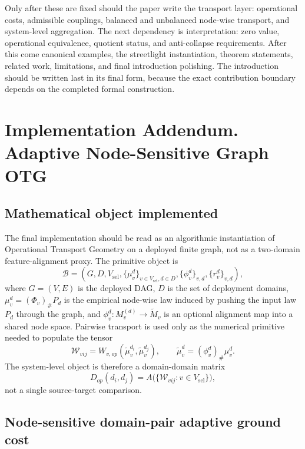 \documentclass[11pt,a4paper]{article}
\begin{document}
Only after these are fixed should the paper write the transport layer: operational costs, admissible couplings, balanced and unbalanced node-wise transport, and system-level aggregation. The next dependency is interpretation: zero value, operational equivalence, quotient status, and anti-collapse requirements. After this come canonical examples, the streetlight instantiation, theorem statements, related work, limitations, and final introduction polishing. The introduction should be written last in its final form, because the exact contribution boundary depends on the completed formal construction.


\section*{Implementation Addendum. Adaptive Node-Sensitive Graph OTG}

\subsection*{Mathematical object implemented}

The final implementation should be read as an algorithmic instantiation of Operational Transport Geometry on a deployed finite graph, not as a two-domain feature-alignment proxy. The primitive object is
\[
\mathcal B=(G,D,V_{\mathrm{sel}},\{\mu_v^d\}_{v\in V_{\mathrm{sel}},d\in D},\{\phi_v^d\}_{v,d},\{r_v^d\}_{v,d}),
\]
where \(G=(V,E)\) is the deployed DAG, \(D\) is the set of deployment domains, \(\mu_v^d=(\Phi_v)_\#P_d\) is the empirical node-wise law induced by pushing the input law \(P_d\) through the graph, and \(\phi_v^d:M_v^{(d)}\to\widetilde M_v\) is an optional alignment map into a shared node space. Pairwise transport is used only as the numerical primitive needed to populate the tensor
\[
\mathcal W_{vij}=W_{v,op}(\widetilde\mu_v^{d_i},\widetilde\mu_v^{d_j}),
\qquad
\widetilde\mu_v^d=(\phi_v^d)_\#\mu_v^d.
\]
The system-level object is therefore a domain-domain matrix
\[
D_{op}(d_i,d_j)=A\bigl(\{\mathcal W_{vij}:v\in V_{\mathrm{sel}}\}\bigr),
\]
not a single source-target comparison.

\subsection*{Node-sensitive domain-pair adaptive ground cost}
\end{document}
